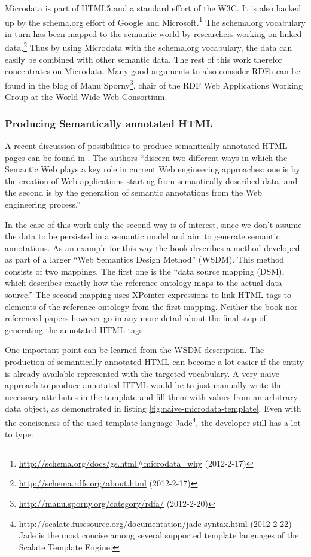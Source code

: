 \documentclass[12pt,a4paper]{scrartcl}		%
\newcommand{\citeurl}[2]{\url{#1} (#2)}
\begin{document}
Microdata is part of HTML5 and a standard effort of the W3C.\cite{Hickson2011}
It is also backed up by the schema.org effort of Google and
Microsoft.\footnote{\citeurl{http://schema.org/docs/gs.html\#microdata_why}{2012-2-17}}
The schema.org vocabulary in turn has been mapped to the semantic world by
researchers working on linked
data.\footnote{\citeurl{http://schema.rdfs.org/about.html}{2012-2-17}} Thus by
using Microdata with the schema.org vocabulary, the data can easily be combined
with other semantic data. The rest of this work therefor concentrates on
Microdata. Many good arguments to also consider RDFa can be found in the blog of
Manu
Sporny\footnote{\citeurl{http://manu.sporny.org/category/rdfa/}{2012-2-20}},
chair of the RDF Web Applications Working Group at the World Wide Web
Consortium.


\subsubsection{Producing Semantically annotated HTML}

A recent discussion of possibilities to produce semantically annotated HTML
pages can be found in \cite[sec. 9.1.3]{DBLP:books/daglib/0023755}. The authors ``discern
two different ways in which the Semantic Web plays a key role in current Web
engineering approaches: one is by the creation of Web applications starting from
semantically described data, and the second is by the generation of semantic
annotations from the Web engineering process.''

In the case of this work only the second way is of interest, since we don't
assume the data to be persisted in a semantic model and aim to generate semantic
annotations. As an example for this way the book describes a method developed as
part of a larger ``Web Semantics Design Method'' (WSDM).  This method consists
of two mappings. The first one is the ``data source mapping (DSM), which
describes exactly how the reference ontology maps to the actual data source.''
The second mapping uses XPointer expressions to link HTML tags to elements of
the reference ontology from the first mapping. Neither the book nor referenced
papers however go in any more detail about the final step of generating the
annotated HTML tags.

One important point can be learned from the WSDM description. The production of
semantically annotated HTML can become a lot easier if the entity is already
available represented with the targeted vocabulary. A very naive approach to
produce annotated HTML would be to just manually write the necessary attributes
in the template and fill them with values from an arbitrary data object, as
demonstrated in listing \ref{fig:naive-microdata-template}. Even with the
conciseness of the used template language
Jade\footnote{\citeurl{http://scalate.fusesource.org/documentation/jade-syntax.html}{2012-2-22}
  Jade is the most concise among several supported template languages of the
  Scalate Template Engine.}, the developer still has a lot to type.
\end{document}
